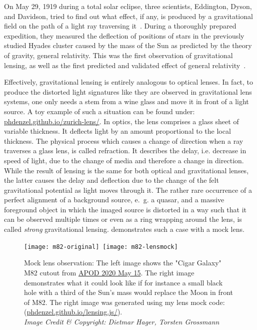 
On May 29, 1919 during a total solar eclipse, three scientists, Eddington,
Dyson, and Davidson, tried to find out what effect, if any, is produced by a
gravitational field on the path of a light ray traversing
it~\cite{Eddington1920}.  During a thoroughly prepared expedition, they measured
the deflection of positions of stars in the previously studied Hyades cluster
caused by the mass of the Sun as predicted by the theory of gravity, general
relativity.  This was the first observation of gravitational lensing, as well as
the first predicted and validated effect of general
relativity~.

Effectively, gravitational lensing is entirely analogous to optical lenses. In
fact, to produce the distorted light signatures like they are observed in
gravitational lens systems, one only needs a stem from a wine glass and move it
in front of a light source.  A toy example of such a situation can be found
under:
\href{https://phdenzel.github.io/zurich-lens/}{phdenzel.github.io/zurich-lens/}.
In optics, the lens comprises a glass sheet of variable thickness.  It deflects
light by an amount proportional to the local thickness.  The physical process
which causes a change of direction when a ray traverses a glass lens, is called
refraction.  It describes the delay, i.e. decrease in speed of light, due to the
change of media and therefore a change in direction.  While the result of
lensing is the same for both optical and gravitational lenses, the latter causes
the delay and deflection due to the change of the felt gravitational potential
as light moves through it.  The rather rare occurrence of a perfect alignment of
a background source, e.~g. a quasar, and a massive foreground object in which
the imaged source is distorted in a way such that it can be observed multiple
times or even as a ring wrapping around the lens, is called \textit{strong}
gravitational lensing.   demonstrates such a case with a
mock lens.
\begin{figure}[h]
    \centering
    \texttt{[image: m82-original]}\,%
    \texttt{[image: m82-lensmock]}
    \caption[Mock lens image of M82]{Mock lens observation: The left image shows
    the "Cigar Galaxy" M82 cutout from
    \href{https://apod.nasa.gov/apod/ap200515.html}{APOD 2020 May 15}. The right
    image demonstrates what it could look like if for instance a small black
    hole with a third of the Sun's mass would replace the Moon in front of M82.
    The right image was generated using my lens mock code: 
    (\href{https://phdenzel.github.io/lensing.js/}{phdenzel.github.io/lensing.js/}).\\
    \textit{Image Credit \& Copyright: Dietmar Hager, Torsten Grossmann}}
\end{figure}

